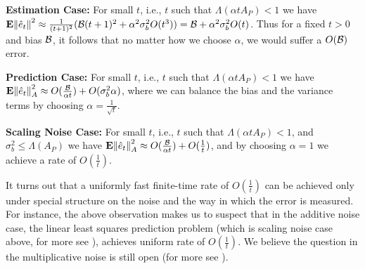 \textbf{Estimation Case:} For small $t$, i.e., $t$ such that $\Lambda(\alpha t A_P)<1$ we have $\mathbf{E}{\left\| \hat{e}_t\right\|^2}\approx \frac{1}{(t+1)^2}(\mathcal{B} (t+1)^2+ \alpha^2\sigma_b^2 O(t^3))=\mathcal{B}+\alpha^2\sigma_b^2 O(t)$. Thus for a fixed $t>0$ and bias $\mathcal{B}$, it follows that no matter how we choose $\alpha$, we would suffer a $O(\mathcal{B})$ error.

\textbf{Prediction Case:} For small $t$, i.e., $t$ such that $\Lambda(\alpha t A_P)<1$ we have $\mathbf{E}{\left\| \hat{e}_t\right\|^2_A}\approx O(\frac{\mathcal{B}}{\alpha t})+O(\sigma^2_b\alpha)$, where we can balance the bias and the variance terms by choosing $\alpha=\frac{1}{\sqrt{t}}$.

\textbf{Scaling Noise Case:} For small $t$, i.e., $t$ such that $\Lambda(\alpha t A_P)<1$, and $\sigma_b^2\leq \Lambda(A_P)$ we have $\mathbf{E}{\left\| \hat{e}_t\right\|^2_A}\approx O(\frac{\mathcal{B}}{\alpha t})+O(\frac{1}{t})$, and by choosing $\alpha=1$ we achieve a rate of $O(\frac{1}{t})$.

It turns out that a uniformly fast finite-time rate of $O(\frac{1}{t})$ can be achieved only under special structure on the noise and the way in which the error is measured. For instance, the above observation makes us to suspect that in the additive noise case, the linear least squares prediction problem (which is scaling noise case above, for more see \cite{bach}), achieves uniform rate of $O(\frac{1}{t})$. We believe the question in the multiplicative noise is still open (for more see \cite{bach}).

